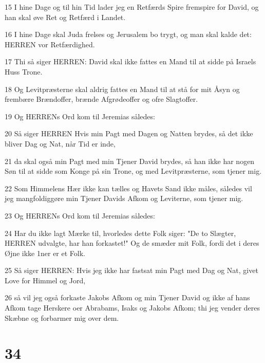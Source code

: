 \par 15 I hine Dage og til hin Tid lader jeg en Retfærds Spire fremspire for David, og han skal øve Ret og Retfærd i Landet.
\par 16 I hine Dage skal Juda frelses og Jerusalem bo trygt, og man skal kalde det: HERREN vor Retfærdighed.
\par 17 Thi så siger HERREN: David skal ikke fattes en Mand til at sidde på Israels Huss Trone.
\par 18 Og Levitpræsterne skal aldrig fattes en Mand til at stå for mit Åsyn og frembære Brændoffer, brænde Afgrødeoffer og ofre Slagtoffer.
\par 19 Og HERRENs Ord kom til Jeremias således:
\par 20 Så siger HERREN Hvis min Pagt med Dagen og Natten brydes, så det ikke bliver Dag og Nat, når Tid er inde,
\par 21 da skal også min Pagt med min Tjener David brydes, så han ikke har nogen Søn til at sidde som Konge på sin Trone, og med Levitpræsterne, som tjener mig.
\par 22 Som Himmelens Hær ikke kan tælles og Havets Sand ikke måles, således vil jeg mangfoldiggøre min Tjener Davids Afkom og Leviterne, som tjener mig.
\par 23 Og HERRENs Ord kom til Jeremias således:
\par 24 Har du ikke lagt Mærke til, hvorledes dette Folk siger: "De to Slægter, HERREN udvalgte, har han forkastet!" Og de smæder mit Folk, fordi det i deres Øjne ikke 1ner er et Folk.
\par 25 Så siger HERREN: Hvis jeg ikke har fastsat min Pagt med Dag og Nat, givet Love for Himmel og Jord,
\par 26 så vil jeg også forkaste Jakobs Afkom og min Tjener David og ikke af hans Afkom tage Herskere oer Abrabams, Isaks og Jakobs Afkom; thi jeg vender deres Skæbne og forbarmer mig over dem.

\chapter{34}

